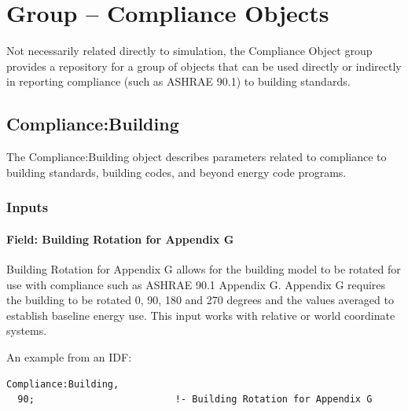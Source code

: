 \section{Group -- Compliance Objects}\label{group-compliance-objects}

Not necessarily related directly to simulation, the Compliance Object group provides a repository for a group of objects that can be used directly or indirectly in reporting compliance (such as ASHRAE 90.1) to building standards.

\subsection{Compliance:Building}\label{compliancebuilding}

The Compliance:Building object describes parameters related to compliance to building standards, building codes, and beyond energy code programs.

\subsubsection{Inputs}\label{inputs-006}

\paragraph{Field: Building Rotation for Appendix G}\label{field-building-rotation-for-appendix-g}

Building Rotation for Appendix G allows for the building model to be rotated for use with compliance such as ASHRAE 90.1 Appendix G. Appendix G requires the building to be rotated 0, 90, 180 and 270 degrees and the values averaged to establish baseline energy use. This input works with relative or world coordinate systems.

An example from an IDF:

\begin{lstlisting}
Compliance:Building,
  90;                         !- Building Rotation for Appendix G
\end{lstlisting}
